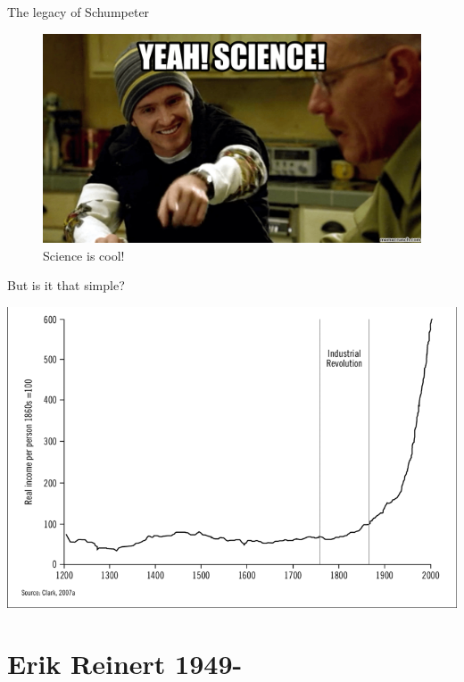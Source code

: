 \documentclass{beamer}
\begin{document}
\begin{frame}{The legacy of Schumpeter}

\begin{figure}[htpb]
	\centering
	\includegraphics[width=0.9\linewidth]{../img/yayscience.png}
	\caption{Science is cool!}%
\end{figure}	

\end{frame}

\begin{frame}{But is it that simple?}

	\centering
	\includegraphics[width=\textwidth]{../img/realincome.png} 

\end{frame}

\section{Erik Reinert 1949-}
\end{document}
